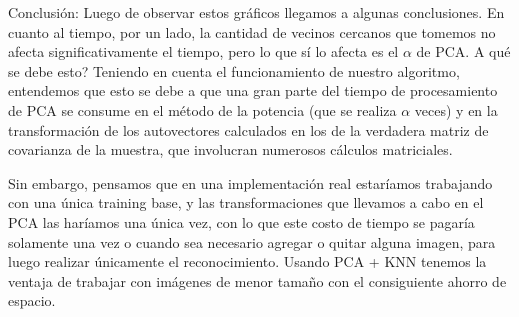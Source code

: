 Conclusión:
Luego de observar estos gráficos llegamos a algunas conclusiones.
En cuanto al tiempo, por un lado, la cantidad de vecinos cercanos que tomemos no afecta significativamente el tiempo, pero lo que sí lo afecta es el $\alpha$ de PCA.
A qué se debe esto? Teniendo en cuenta el funcionamiento de nuestro algoritmo, entendemos que esto se debe a que una gran parte del tiempo de procesamiento de PCA se consume en el método de la potencia (que se realiza $\alpha$ veces) y en la transformación de los autovectores calculados en los de la verdadera matriz de covarianza de la muestra, que involucran numerosos cálculos matriciales.

Sin embargo, pensamos que en una implementación real estaríamos trabajando con una única training base, y las transformaciones que llevamos a cabo en el PCA las haríamos una única vez, con lo que este costo de tiempo se pagaría solamente una vez o cuando sea necesario agregar o quitar alguna imagen, para luego realizar únicamente el reconocimiento. Usando PCA + KNN tenemos la ventaja de trabajar con imágenes de menor tamaño con el consiguiente ahorro de espacio.